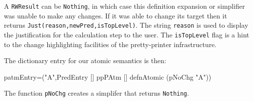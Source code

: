 A \texttt{RWResult} can be \texttt{Nothing},
in which case this definition expansion or simplifier
was unable to make any changes.
If it was able to change its target then it returns
\texttt{Just(reason,newPred,isTopLevel)}.
The string \texttt{reason} is used to display the justification for the
calculation step to the user.
The \texttt{isTopLevel} flag is a hint to the change highlighting facilities
of the pretty-printer infrastructure.


The dictionary entry for our atomic semantics is then:
\begin{code}
patmEntry=("A",PredEntry [] ppPAtm [] defnAtomic (pNoChg "A"))
\end{code}
The function \texttt{pNoChg} creates a simplifer that returns \texttt{Nothing}.
